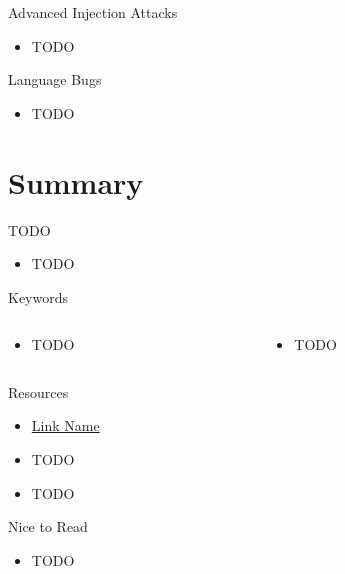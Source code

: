 \documentclass{curs}
\begin{document}
\begin{frame}{Advanced Injection Attacks}
  \begin{itemize}
    \item TODO
  \end{itemize}
\end{frame}

\begin{frame}{Language Bugs}
  \begin{itemize}
    \item TODO
  \end{itemize}
\end{frame}

\section{Summary}

\begin{frame}{TODO}
  \begin{itemize}
    \item TODO
  \end{itemize}
\end{frame}

\begin{frame}{Keywords}
  \begin{columns}
    \begin{column}{0.5\textwidth}
      \begin{itemize}
        \item TODO
      \end{itemize}
    \end{column}
    \begin{column}{0.5\textwidth}
      \begin{itemize}
        \item TODO
      \end{itemize}
    \end{column}
  \end{columns}
\end{frame}

\begin{frame}{Resources}
  \begin{itemize}
    \item \href{https://link.url.com/}{Link Name}
    \item TODO
    \item TODO
  \end{itemize}
\end{frame}

\begin{frame}{Nice to Read}
  \begin{itemize}
    \item TODO
  \end{itemize}
\end{frame}
\end{document}
